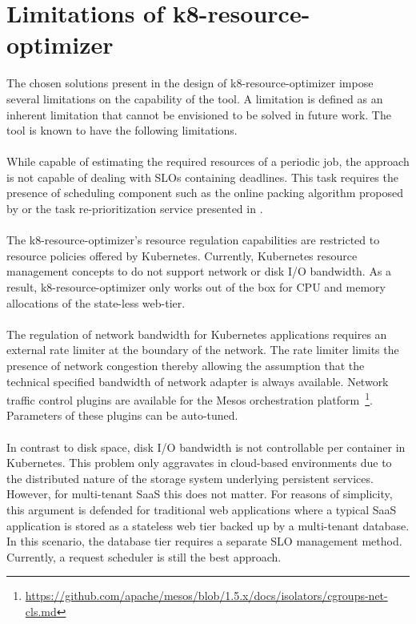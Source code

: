 \section{Limitations of k8-resource-optimizer}
The chosen solutions present in the design of k8-resource-optimizer impose several limitations on the capability of the tool. A limitation is defined as an inherent limitation that cannot be envisioned to be solved in future work. The tool is known to have the following limitations.\\\\
While capable of estimating the required resources of a periodic job, the approach is not capable of dealing with SLOs containing deadlines. This task requires the presence of scheduling component such as the online packing algorithm proposed by \cite{jyothi2016morpheus} or the task re-prioritization service presented in \cite{Walraven2015b}.
\\\\
The k8-resource-optimizer's resource regulation capabilities are restricted to resource policies offered by Kubernetes. Currently, Kubernetes resource management concepts to do not support network or disk I/O bandwidth. As a result, k8-resource-optimizer only works out of the box for CPU and memory allocations of the state-less web-tier. \\\\ 
The regulation of network bandwidth for Kubernetes applications requires an external rate limiter at the boundary of the network. The rate limiter limits the presence of network congestion thereby allowing the assumption that the technical specified bandwidth of network adapter is always available. Network traffic control plugins are available for the Mesos orchestration platform~\footnote{\url{https://github.com/apache/mesos/blob/1.5.x/docs/isolators/cgroups-net-cls.md}}. Parameters of these plugins can be auto-tuned. \\\\
In contrast to disk space, disk I/O bandwidth is not controllable per container in Kubernetes. This problem only aggravates in cloud-based environments due to the distributed nature of the storage system underlying persistent services.     However, for multi-tenant SaaS this does not matter. For reasons of simplicity, this argument is defended for traditional web applications where a typical SaaS application is stored as a stateless web tier backed up by a multi-tenant database. In this scenario, the database tier requires a separate SLO management method. Currently, a request scheduler is still the best approach.



